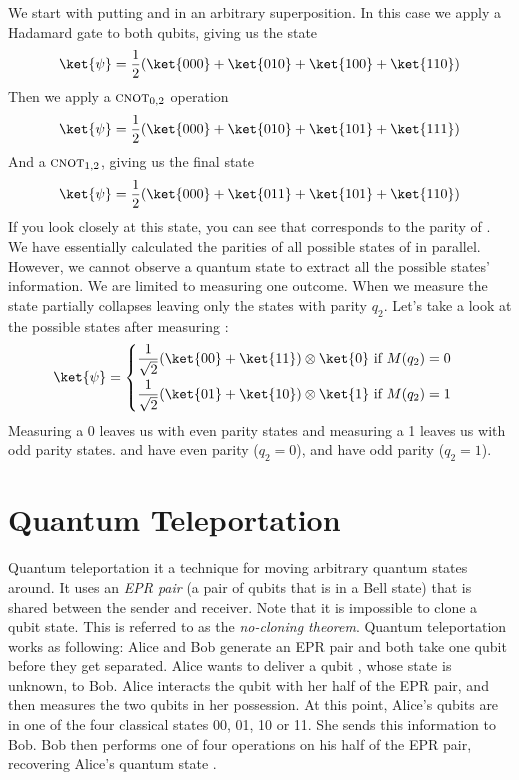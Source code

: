 \documentclass[11pt, notitlepage]{report}
\begin{document}
We start with putting  and  in an arbitrary superposition. In this case we apply a Hadamard gate to both qubits, giving us the state
\[
  \ket{\psi} = \dfrac{1}{2}(\ket{000} + \ket{010} + \ket{100} + \ket{110})
\]
Then we apply a $\textsc{cnot}_{0,2}$ operation
\[
  \ket{\psi} = \dfrac{1}{2}(\ket{000} + \ket{010} + \ket{101} + \ket{111})
\]
And a $\textsc{cnot}_{1,2}$, giving us the final state
\[
  \ket{\psi} = \dfrac{1}{2}(\ket{000} + \ket{011} + \ket{101} + \ket{110})
\]
If you look closely at this state, you can see that  corresponds to the parity of . We have essentially calculated the parities of all possible states of  in parallel. However, we cannot observe a quantum state to extract all the possible states' information. We are limited to measuring one outcome. When we measure  the state partially collapses leaving only the states with parity $q_2$. Let's take a look at the possible states after measuring :
\[
\ket{\psi} = 
\begin{cases}
\begin{aligned}
\dfrac{1}{\sqrt2}(\ket{00} + \ket{11}) \otimes \ket{0} & \text{ if } M(q_2) = 0 \\
\dfrac{1}{\sqrt2}(\ket{01} + \ket{10}) \otimes \ket{1} & \text{ if } M(q_2) = 1
\end{aligned}
\end{cases}
\]
Measuring a 0 leaves us with even parity states and measuring a 1 leaves us with odd parity states.  and  have even parity ($q_2 = 0$),  and  have odd parity ($q_2 = 1$).

\section{Quantum Teleportation}
Quantum teleportation it a technique for moving arbitrary quantum states around. It uses an \emph{EPR pair} (a pair of qubits that is in a Bell state) that is shared between the sender and receiver. Note that it is impossible to clone a qubit state. This is referred to as the \emph{no-cloning theorem}. Quantum teleportation works as following: Alice and Bob generate an EPR pair and both take one qubit before they get separated. Alice wants to deliver a qubit \ket{\phi}, whose state is unknown, to Bob. Alice interacts the qubit \ket{\phi} with her half of the EPR pair, and then measures the two qubits in her possession. At this point, Alice's qubits are in one of the four classical states 00, 01, 10 or 11. She sends this information to Bob. Bob then performs one of four operations on his half of the EPR pair, recovering Alice's quantum state \ket{\phi}.
\end{document}
